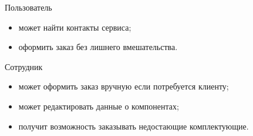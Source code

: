 Пользователь
\begin{itemize}
	\item может найти контакты сервиса;
	\item оформить заказ без лишнего вмешательства.
\end{itemize}

Сотрудник
\begin{itemize}
	\item может оформить заказ вручную если потребуется клиенту;
	\item может редактировать данные о компонентах;
	\item получит возможность заказывать недостающие комплектующие.
\end{itemize}
